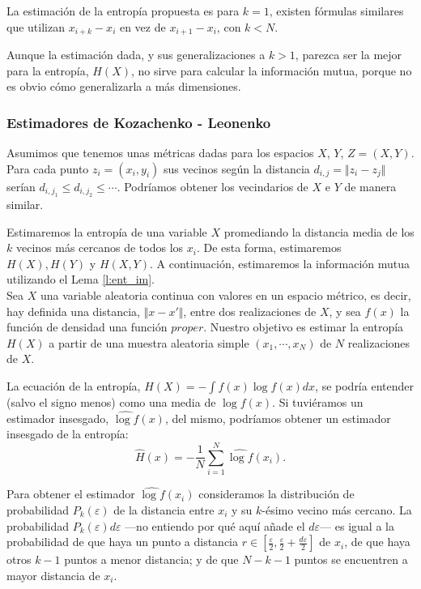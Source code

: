 \documentclass[10pt,a4paper]{article} %
\theoremstyle{definition}
\begin{document}
La estimación de la entropía propuesta es para $k=1$, existen fórmulas similares que utilizan $x_{i+k}-x_i$  en vez de $x_{i+1}-x_i$, con $k < N$.

Aunque la estimación dada, y sus generalizaciones a $k>1$, parezca ser la mejor para la entropía, $H(X)$, no sirve para calcular la información mutua, porque no es obvio cómo generalizarla a más dimensiones.

\subsubsection{Estimadores de Kozachenko - Leonenko}

Asumimos que tenemos unas métricas dadas para los espacios $X$, $Y$, $Z = (X,Y)$. Para cada punto $z_i = (x_i, y_i)$ sus vecinos según la distancia $d_{i,j}=\Vert z_i-z_j \Vert$ serían $d_{i,j_1} \leq d_{i,j_2} \leq \cdots$. Podríamos obtener los vecindarios de $X$ e $Y$ de manera similar.

Estimaremos la entropía de una variable $X$ promediando la distancia media de los $k$ vecinos más cercanos de todos los $x_i$. De esta forma, estimaremos $H(X), H(Y)$ y $H(X,Y)$. A continuación, estimaremos la información mutua utilizando el Lema \ref{l:ent_im}.\\

Sea $X$ una variable aleatoria continua con valores en un espacio métrico, es decir, hay definida una distancia, $\Vert x - x'\Vert$, entre dos realizaciones de $X$, y sea $f(x)$ la función de densidad una función $proper$. Nuestro objetivo es estimar la entropía $H(X)$ a partir de una muestra aleatoria simple $(x_1,\cdots,x_N)$ de $N$ realizaciones de $X$.

La ecuación de la entropía, $H(X) = - \int f(x) \log f(x) dx$, se podría entender (salvo el signo menos) como una media de $\log f(x)$. Si tuviéramos un estimador insesgado, $\widehat{\log f}(x)$, del mismo, podríamos obtener un estimador insesgado de la entropía:\[
\widehat{H}(x) = - \frac{1}{N} \sum_{i=1}^N\widehat{\log f}(x_i).\]

Para obtener el estimador $\widehat{\log f}(x_i)$ consideramos la distribución de probabilidad $P_k(\varepsilon)$ de la distancia entre $x_i$ y su $k$-ésimo vecino más cercano. La probabilidad $P_k(\varepsilon)d\varepsilon$ ---no entiendo por qué aquí añade el $d\varepsilon$--- es igual a la probabilidad de que haya un punto a distancia $r\in \left[ \frac{\varepsilon}{2}, \frac{\varepsilon}{2} + \frac{d\varepsilon}{2} \right ]$ de $x_i$, de que haya otros $k-1$ puntos a menor distancia; y de que $N-k-1$ puntos se encuentren a mayor distancia de $x_i$.
\end{document}
